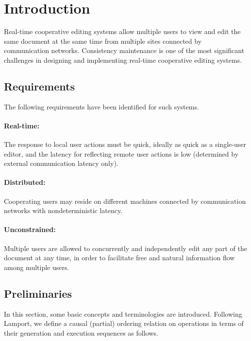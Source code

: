 \documentclass[11pt,a4paper]{article}
\begin{document}
\setlength{\parindent}{0pt}

\newtheorem{defn}{Definition}
\newtheorem{spec}{Specification}




\newpage

\tableofcontents
\newpage
\listoftables
\listoffigures
\newpage



\newpage


\section{Introduction}
Real-time cooperative editing systems allow multiple users to view and edit the same document at the same time from multiple sites connected by communication networks. Consistency maintenance is one of the most significant challenges in designing and implementing real-time cooperative editing systems. 


\subsection{Requirements}
The following requirements have been identified for such systems.

\paragraph{Real-time:} The response to local user actions must be quick, ideally as quick as a single-user editor, and the latency for reflecting remote user actions is low (determined by external communication latency only). 

\paragraph{Distributed:} Cooperating users may reside on different machines connected by communication networks with nondeterministic latency.

\paragraph{Unconstrained:} Multiple users are allowed to concurrently and independently edit any part of the document at any time, in order to facilitate free and natural information flow among multiple users.


\subsection{Preliminaries}
In this section, some basic concepts and terminologies are introduced. Following Lamport\cite{lamport78}, we define a causal (partial) ordering relation on operations in terms of their generation and execution sequences as follows.
\end{document}
